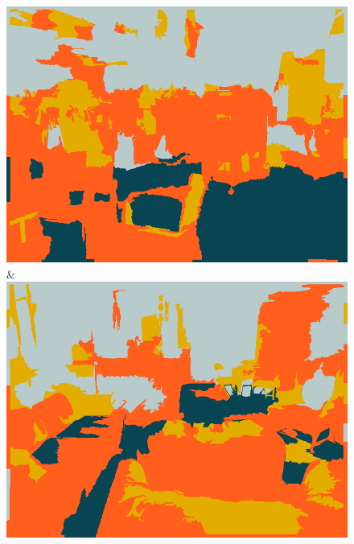 \documentclass[a4paper, 10pt, conference]{ieeeconf}      %
\begin{document}
\begin{figure}
\begin{tabu}
    \includegraphics[width=\linewidth]{images/00118_svm.png}&%
    \includegraphics[width=\linewidth]{images/01203_svm.png}\\
    \vspace{3mm}\\


\end{tabu}
\end{figure}
\end{document}
